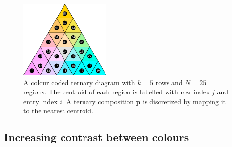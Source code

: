 \documentclass[parskip=half]{scrartcl}
\begin{document}
\begin{appendix}
\begin{figure}[!htb]
  \centering
  \includegraphics[width = 0.4\textwidth]{./fig/tern_quant.pdf}
  \caption{A colour coded ternary diagram with $k = 5$ rows and $N = 25$ regions. The centroid of each region is labelled with row index $j$ and entry index $i$. A ternary composition $\textbf{p}$ is discretized by mapping it to the nearest centroid.}
  \label{fig:tern_quant}
\end{figure}

\clearpage

\subsection{Increasing contrast between colours}
\label{ssec:lboost}


\end{appendix}
\end{document}
